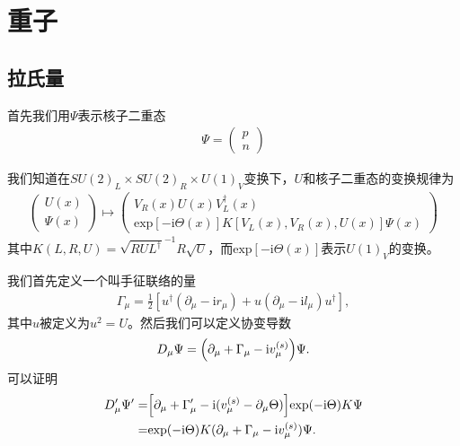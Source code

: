 \documentclass[aps,tightenlines,16pt]{ctexart}
\numberwithin{equation}{section}
\newcommand{\mL}{\mathcal{L}}
\begin{document}
\newpage
\section{重子}
\subsection{拉氏量}
首先我们用$\Psi$表示核子二重态
\begin{align}
   \Psi = \begin{pmatrix}
      p\\
      n
   \end{pmatrix}
\end{align}

我们知道在$SU(2)_L\times SU(2)_R\times U(1)_V$变换下，$U$和核子二重态的变换规律为
\begin{align}
   \begin{pmatrix}
      U(x)\\
      \Psi(x)
   \end{pmatrix}
   \mapsto
   \begin{pmatrix}
      V_R(x)U(x)V_L^{\dagger}(x)\\
      \text{exp}[-\mbox{i}\Theta(x)]K[V_L(x),V_R(x),U(x)]\Psi(x)
   \end{pmatrix}
\end{align}
其中$K(L,R,U)=\sqrt{RUL^{\dagger}}^{-1}R\sqrt{U}$，而$\text{exp}[-\mbox{i}\Theta(x)]$表示$U(1)_V$的变换。

我们首先定义一个叫手征联络的量
\begin{align}
   \Gamma_{\mu}=\frac{1}{2}[u^{\dagger}(\partial_{\mu}-\mbox{i}r_{\mu})+u(\partial_{\mu}-\mbox{i}l_{\mu})u^{\dagger}],
\end{align}
其中$u$被定义为$u^2 =U$。然后我们可以定义协变导数
\begin{align}
   D_{\mu}\Psi = \Bigl(\partial_{\mu}+\Gamma_{\mu}-\mbox{i}v_{\mu}^{(s)}\Bigr)\Psi.
\end{align}
可以证明
\begin{align}
   \begin{aligned}
      D_{\mu}^{\prime}\Psi^{\prime} =& \Bigl[\partial_{\mu}+\Gamma_{\mu}^{\prime} - \mbox{i}(v_{\mu}^{(s)}-\partial_{\mu}\Theta)\Bigr]\text{exp}(-\mbox{i}\Theta)K\Psi\\
      =&\text{exp}(-\mbox{i}\Theta)K(\partial_{\mu}+\Gamma_{\mu}-\mbox{i}v_{\mu}^{(s)})\Psi.
   \end{aligned}
\end{align}
\end{document}

